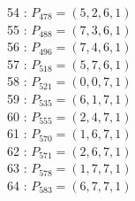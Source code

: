 \documentclass{article}
\begin{document}
{\begin{multicols}{3}
54 : $P_{478}=( 5, 2, 6, 1 )$\\
55 : $P_{488}=( 7, 3, 6, 1 )$\\
56 : $P_{496}=( 7, 4, 6, 1 )$\\
57 : $P_{518}=( 5, 7, 6, 1 )$\\
58 : $P_{521}=( 0, 0, 7, 1 )$\\
59 : $P_{535}=( 6, 1, 7, 1 )$\\
60 : $P_{555}=( 2, 4, 7, 1 )$\\
61 : $P_{570}=( 1, 6, 7, 1 )$\\
62 : $P_{571}=( 2, 6, 7, 1 )$\\
63 : $P_{578}=( 1, 7, 7, 1 )$\\
64 : $P_{583}=( 6, 7, 7, 1 )$\\
\end{multicols}


%


%


}%
\end{document}
